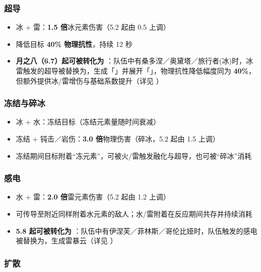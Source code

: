 \subsubsection{超导}

\begin{itemize}
  \item {}冰 + 雷：\textbf{1.5 倍}冰元素伤害（5.2 起由 0.5 上调）
  \item 降低目标 \textbf{40\% 物理抗性}，持续 12 秒
  \item \textbf{月之八（6.7）起可被转化为 }：队伍中有桑多涅／奥黛塔／旅行者(冰)时，冰雷触发的超导被替换为，生成「」并展开「」，物理抗性降低幅度同为 \textbf{40\%}，但额外提供冰/雷增伤与基础系数提升（详见 ）
\end{itemize}

\subsubsection{冻结与碎冰}

\begin{itemize}
  \item {}冰 + 水：冻结目标（冻结元素量随时间衰减）
  \item 冻结 + 钝击／岩伤：\textbf{3.0 倍}物理伤害（碎冰，5.2 起由 1.5 上调）
  \item 冻结期间目标附着“冻元素”，可被火/雷触发融化与超导，也可被“碎冰”消耗
\end{itemize}

\subsubsection{感电}

\begin{itemize}
  \item {}水 + 雷：\textbf{2.0 倍}雷元素伤害（5.2 起由 1.2 上调）
  \item 可传导至附近同样附着水元素的敌人；水/雷附着在反应期间共存并持续消耗
  \item \textbf{5.8 起可被转化为 }：队伍中有伊涅芙／菲林斯／哥伦比娅时，队伍触发的感电被替换为，生成雷暴云（详见 ）
\end{itemize}

\subsubsection{扩散}\label{sec:swirl}


